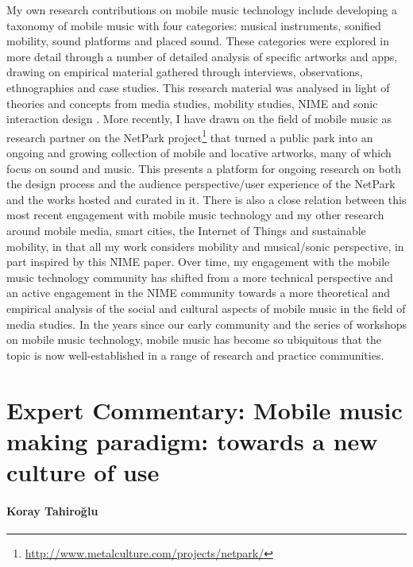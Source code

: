My own research contributions on mobile music technology include developing a taxonomy of mobile music with four categories: musical instruments, sonified mobility, sound platforms and placed sound. These categories were explored in more detail through a number of detailed analysis of specific artworks and apps, drawing on empirical material gathered through interviews, observations, ethnographies and case studies. This research material was analysed in light of theories and concepts from media studies, mobility studies, NIME and sonic interaction design \cite{Behrendt:2015}. More recently, I have drawn on the field of mobile music as research partner on the NetPark project\footnote{\url{http://www.metalculture.com/projects/netpark/}} that turned a public park into an ongoing and growing collection of mobile and locative artworks, many of which focus on sound and music. This presents a platform for ongoing research on both the design process and the audience perspective/user experience of the NetPark and the works hosted and curated in it. There is also a close relation between this most recent engagement with mobile music technology and my other research around mobile media, smart cities, the Internet of Things and sustainable mobility, in that all my work considers mobility and musical/sonic perspective, in part inspired by this NIME paper. Over time, my engagement with the mobile music technology community has shifted from a more technical perspective and an active engagement in the NIME community towards a more theoretical and empirical analysis of the social and cultural aspects of mobile music in the field of media studies.
In the years since our early community and the series of workshops on mobile music technology, mobile music has become so ubiquitous that the topic is now well-established in a range of research and practice communities.

\section*{Expert Commentary: Mobile music making paradigm: towards a new culture of use}
\paragraph{Koray Tahiro\u{g}lu}

